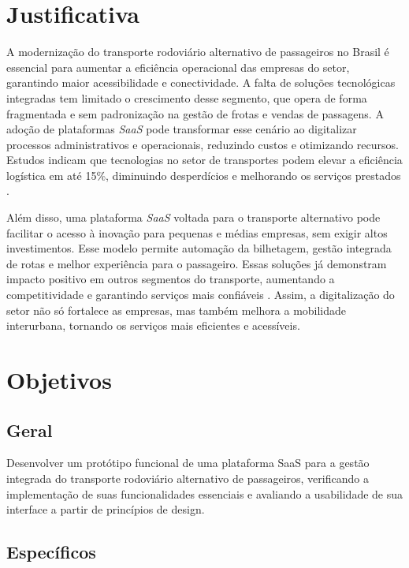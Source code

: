 \section{Justificativa}

A modernização do transporte rodoviário alternativo de passageiros no Brasil é essencial para aumentar a eficiência operacional das empresas do setor, garantindo maior acessibilidade e conectividade. A falta de soluções tecnológicas integradas tem limitado o crescimento desse segmento, que opera de forma fragmentada e sem padronização na gestão de frotas e vendas de passagens. A adoção de plataformas \textit{SaaS} pode transformar esse cenário ao digitalizar processos administrativos e operacionais, reduzindo custos e otimizando recursos. Estudos indicam que tecnologias no setor de transportes podem elevar a eficiência logística em até 15\%, diminuindo desperdícios e melhorando os serviços prestados \cite{setcepar2023}.

Além disso, uma plataforma \textit{SaaS} voltada para o transporte alternativo pode facilitar o acesso à inovação para pequenas e médias empresas, sem exigir altos investimentos. Esse modelo permite automação da bilhetagem, gestão integrada de rotas e melhor experiência para o passageiro. Essas soluções já demonstram impacto positivo em outros segmentos do transporte, aumentando a competitividade e garantindo serviços mais confiáveis \cite{prologapp2024}. Assim, a digitalização do setor não só fortalece as empresas, mas também melhora a mobilidade interurbana, tornando os serviços mais eficientes e acessíveis.

\section{Objetivos}

\subsection{Geral}

Desenvolver um protótipo funcional de uma plataforma SaaS para a gestão integrada do transporte rodoviário alternativo de passageiros, verificando a implementação de suas funcionalidades essenciais e avaliando a usabilidade de sua interface a partir de princípios de design.

\subsection{Específicos}

